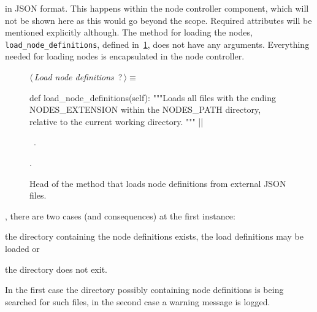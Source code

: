 \documentclass[%
    a4paper,    %
    justified,  %
    nobib,      %
    openany     %
]{tufte-book}
\begin{document}
 in JSON format.
This happens within the node controller component, which will not be shown here
as this would go beyond the scope. Required attributes will be mentioned
explicitly although. The method for loading the nodes,
\texttt{load_node_definitions}, defined
in~\cref{lst:load-node-definitions}, does not have any arguments. Everything
needed for loading nodes is encapsulated in the node controller.

\begin{figure}[h]
  \begin{flushleft} \small
\begin{minipage}{\linewidth}\label{scrap3}\raggedright\small
{} $\langle\,${\itshape Load node definitions}\nobreak\ {\footnotesize {?}}$\,\rangle\equiv$
\vspace{-1ex}
\begin{pythoncode}
def load_node_definitions(self):
    """Loads all files with the ending NODES_EXTENSION
    within the NODES_PATH directory, relative to
    the current working directory.
    """
|\NWsep|
\end{pythoncode}
\vspace{1.5ex}
\footnotesize
\begin{list}{}{\setlength{\itemsep}{-\parsep}\setlength{\itemindent}{-\leftmargin}}
\item \NWtxtMacroDefBy\ .
\item {\NWtxtMacroNoRef}.

\item{}
\end{list}
\end{minipage}\vspace{4ex}
\end{flushleft}
\caption{Head of the method that loads node definitions from external JSON
    files.}
  \label{lst:load-node-definitions}
\end{figure}

, there are two cases (and
consequences) at the first instance:
\begin{enumerate*}
  \item the directory containing the node definitions exists, the load
    definitions may be loaded or
  \item the directory does not exit.
\end{enumerate*}
In the first case the directory possibly containing node definitions is being
searched for such files, in the second case a warning message is logged.
\end{document}
